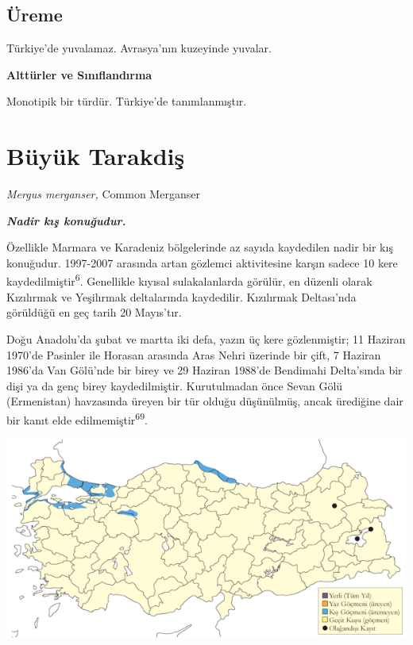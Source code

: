 \documentclass[
  letterpaper,
  DIV=11,
  numbers=noendperiod]{scrreprt}
\begin{document}
\hypertarget{uxfcreme-31}{%
\subsection{\texorpdfstring{\textbf{Üreme}}{Üreme}}\label{uxfcreme-31}}

Türkiye'de yuvalamaz. Avrasya'nın kuzeyinde yuvalar.

\textbf{Alttürler ve Sınıflandırma}

Monotipik bir türdür. Türkiye'de tanımlanmıştır.

\hypertarget{buxfcyuxfck-tarakdiux15f}{%
\section{Büyük Tarakdiş}\label{buxfcyuxfck-tarakdiux15f}}

\emph{Mergus merganser,} Common Merganser

\textbf{\emph{Nadir kış konuğudur.}}

Özellikle Marmara ve Karadeniz bölgelerinde az sayıda kaydedilen nadir
bir kış konuğudur. 1997-2007 arasında artan gözlemci aktivitesine karşın
sadece 10 kere kaydedilmiştir\textsuperscript{6}. Genellikle kıyısal
sulakalanlarda görülür, en düzenli olarak Kızılırmak ve Yeşilırmak
deltalarında kaydedilir. Kızılırmak Deltası'nda görüldüğü en geç tarih
20 Mayıs'tır.

Doğu Anadolu'da şubat ve martta iki defa, yazın üç kere gözlenmiştir; 11
Haziran 1970'de Pasinler ile Horasan arasında Aras Nehri üzerinde bir
çift, 7 Haziran 1986'da Van Gölü'nde bir birey ve 29 Haziran 1988'de
Bendimahi Delta'sında bir dişi ya da genç birey kaydedilmiştir.
Kurutulmadan önce Sevan Gölü (Ermenistan) havzasında üreyen bir tür
olduğu düşünülmüş, ancak ürediğine dair bir kanıt elde
edilmemiştir\textsuperscript{69}.

\includegraphics{images/harita_Page_033.png}
\end{document}

